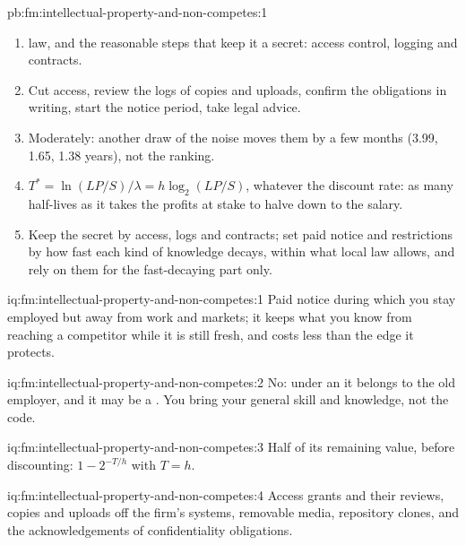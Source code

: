 \begin{solution}{pb:fm:intellectual-property-and-non-competes:1}
\begin{enumerate}
structure's, at a cost of 0.74.
\item {} law, and the reasonable steps that keep it a secret: access control, logging and contracts.
\item Cut access, review the logs of copies and uploads, confirm the obligations in writing, start the notice period, take legal advice.
\item Moderately: another draw of the noise moves them by a few months (3.99, 1.65, 1.38 years), not the ranking.
\item $T^*=\ln(LP/S)/\lambda=h\log_2(LP/S)$, whatever the discount rate: as many half-lives as it takes the profits at stake to halve down to the
salary.
\item Keep the secret by access, logs and contracts; set paid notice and restrictions by how fast each kind of knowledge decays, within what local
law allows, and rely on them for the fast-decaying part only.
\end{enumerate}
\end{solution}

\begin{solution}{iq:fm:intellectual-property-and-non-competes:1}
Paid notice during which you stay employed but away from work and markets; it keeps what you know from reaching a competitor while it is still
fresh, and costs less than the edge it protects.
\end{solution}

\begin{solution}{iq:fm:intellectual-property-and-non-competes:2}
No: under an  it belongs to the old employer, and it may be a . You bring your general skill and
knowledge, not the code.
\end{solution}

\begin{solution}{iq:fm:intellectual-property-and-non-competes:3}
Half of its remaining value, before discounting: $1-2^{-T/h}$ with $T=h$.
\end{solution}

\begin{solution}{iq:fm:intellectual-property-and-non-competes:4}
Access grants and their reviews, copies and uploads off the firm's systems, removable media, repository clones, and the acknowledgements of
confidentiality obligations.
\end{solution}


